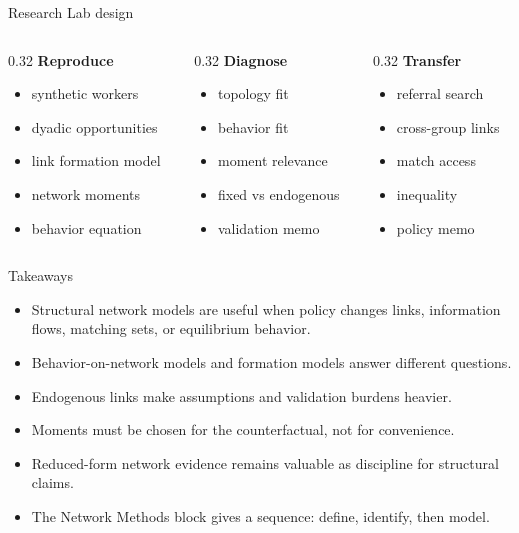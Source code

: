 \documentclass[aspectratio=169,11pt]{beamer}
\newcommand{\1}{\mathbf{1}}
\begin{document}
\begin{frame}{Research Lab design}
\begin{columns}[T,onlytextwidth]
\begin{column}{0.32\linewidth}
\textbf{Reproduce}
\begin{itemize}
    \item synthetic workers
    \item dyadic opportunities
    \item link formation model
    \item network moments
    \item behavior equation
\end{itemize}
\end{column}
\begin{column}{0.32\linewidth}
\textbf{Diagnose}
\begin{itemize}
    \item topology fit
    \item behavior fit
    \item moment relevance
    \item fixed vs endogenous
    \item validation memo
\end{itemize}
\end{column}
\begin{column}{0.32\linewidth}
\textbf{Transfer}
\begin{itemize}
    \item referral search
    \item cross-group links
    \item match access
    \item inequality
    \item policy memo
\end{itemize}
\end{column}
\end{columns}
\end{frame}

\begin{frame}{Takeaways}
\begin{itemize}
    \item Structural network models are useful when policy changes links, information flows, matching sets, or equilibrium behavior.
    \item Behavior-on-network models and formation models answer different questions.
    \item Endogenous links make assumptions and validation burdens heavier.
    \item Moments must be chosen for the counterfactual, not for convenience.
    \item Reduced-form network evidence remains valuable as discipline for structural claims.
    \item The Network Methods block gives a sequence: define, identify, then model.
\end{itemize}
\end{frame}
\end{document}
